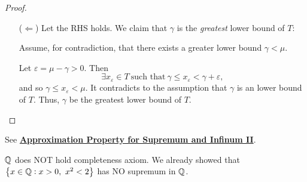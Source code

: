 \documentclass[11pt,openany]{article}
\begin{document}
\begin{proof}
\begin{enumerate}[(1)]
\begin{itemize}
			\vspace{10pt}
			\item[($\Leftarrow$)] Let the RHS holds. We claim that $\gamma$ is the \textit{greatest} lower bound of $T$:\par
				\begin{center}
					
				\end{center}
				Assume, for contradiction, that there exists a greater lower bound $\gamma<\mu$.\par
				Let $\varepsilon=\mu-\gamma>0$. Then \[
				\exists x_\varepsilon\in T\ \text{such that}\ \gamma\leq x_\varepsilon<\gamma+\varepsilon,
				\] and so $ \gamma \leq x_\varepsilon<\mu$. It contradicts to the assumption that $\gamma$ is an lower bound of $T$. Thus, $\gamma$ be the greatest lower bound of $T$.
		\end{itemize}
	\end{enumerate}
\end{proof}

\begin{remark*}
	See \hyperlink{pro2}{\bf Approximation Property for Supremum and Infinum II}.
\end{remark*}
\vfill
{}
\begin{example*}
	$\mathbb{Q}$ does NOT hold completeness axiom. We already showed that $\set{x\in\mathbb{Q}:x>0,\ x^2<2}$ has NO supremum in $\mathbb{Q}$.
\end{example*}
\vfill
{}

\newpage
\end{document}

